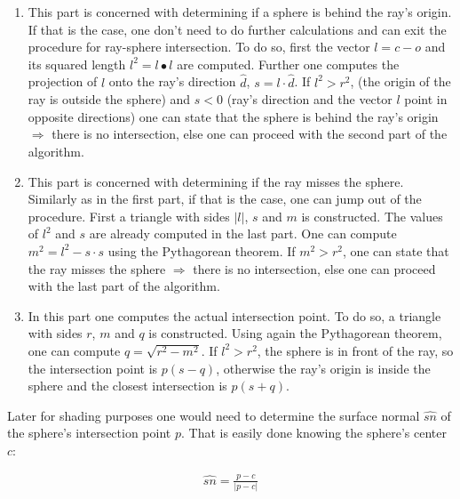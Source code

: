 \documentclass{article}
\begin{document}
\begin{enumerate}[1.]
\item This part is concerned with determining if a sphere is behind the ray's origin. If that is the case, one don't need to do further calculations and can exit the procedure for ray-sphere intersection. To do so, first the vector $l = c - o$ and its squared length $l^2 = l \bullet l$ are computed. Further one computes the projection of $l$ onto the ray's direction $\hat{d}$, $s = l \cdot \hat{d}$. If $l^2 > r^2$, (the origin of the ray is outside the sphere) and $s < 0$ (ray's direction and the vector $l$ point in opposite directions) one can state that the sphere is behind the ray's origin $\Rightarrow$ there is no intersection, else one can proceed with the second part of the algorithm.

\item This part is concerned with determining if the ray misses the sphere. Similarly as in the first part, if that is the case, one can jump out of the procedure. First a triangle with sides $\lvert l \rvert$, $s$ and $m$ is constructed. The values of $l^2$ and $s$ are already computed in the last part. One can compute $m^2 = l^2 - s \cdot s$ using the Pythagorean theorem. If $m^2 > r^2$, one can state that the ray misses the sphere $\Rightarrow$ there is no intersection, else one can proceed with the last part of the algorithm.
	
\item In this part one computes the actual intersection point. To do so, a triangle with sides $r$, $m$ and $q$ is constructed. Using again the Pythagorean theorem, one can compute $q = \sqrt{r^2 - m^2}$. If $l^2 > r^2$, the sphere is in front of the ray, so the intersection point is $p(s-q)$, otherwise the ray's origin is inside the sphere and the closest intersection is $p(s+q)$.
\end{enumerate}

Later for shading purposes one would need to determine the surface normal $\hat{sn}$ of the sphere's intersection point $p$. That is easily done knowing the sphere's center $c$:

\begin{align}
	\hat{sn} = \frac{p - c}{\lvert p - c \rvert}
\end{align}
\end{document}
